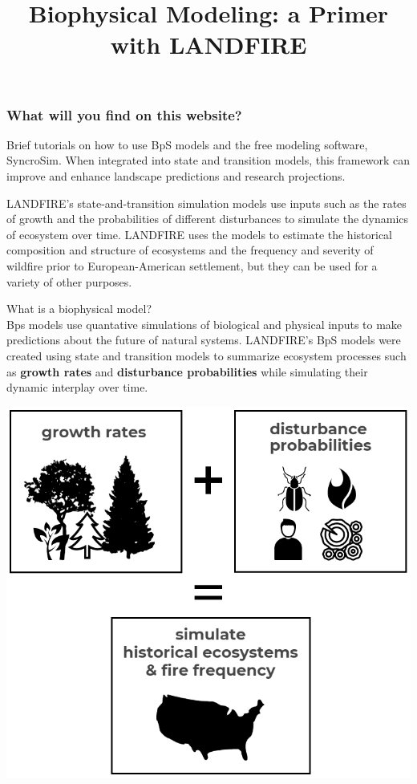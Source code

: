 \documentclass[
]{article}
\title{Biophysical Modeling: a Primer with LANDFIRE}
\author{}
\date{\vspace{-2.5em}}
\begin{document}
\maketitle

\hypertarget{what-will-you-find-on-this-website}{%
\subsubsection{What will you find on this
website?}\label{what-will-you-find-on-this-website}}

Brief tutorials on how to use BpS models and the free modeling software,
SyncroSim. When integrated into state and transition models, this
framework can improve and enhance landscape predictions and research
projections.

LANDFIRE's state-and-transition simulation models use inputs such as the
rates of growth and the probabilities of different disturbances to
simulate the dynamics of ecosystem over time. LANDFIRE uses the models
to estimate the historical composition and structure of ecosystems and
the frequency and severity of wildfire prior to European-American
settlement, but they can be used for a variety of other purposes.

What is a biophysical model?\\
Bps models use quantative simulations of biological and physical inputs
to make predictions about the future of natural systems. LANDFIRE's BpS
models were created using state and transition models to summarize
ecosystem processes such as \textbf{growth rates} and
\textbf{disturbance probabilities} while simulating their dynamic
interplay over time.

\includegraphics{images/inputmodel.png}
\end{document}
